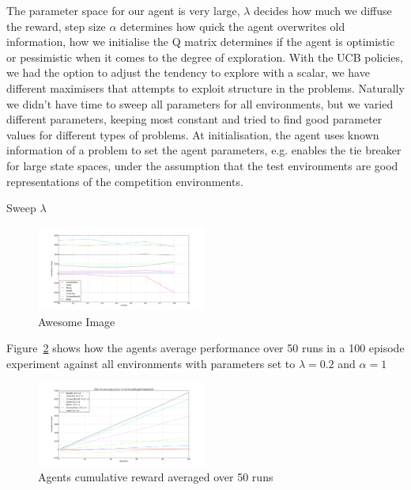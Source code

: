The parameter space for our agent is very large, $\lambda$ decides how much we diffuse the reward, step size $\alpha$ determines how quick the agent overwrites old information, how we initialise the Q matrix determines if the agent is optimistic or pessimistic when it comes to the degree of exploration. With the UCB policies, we had the option to adjust the tendency to explore with a scalar, we have different maximisers that attempts to exploit structure in the problems. Naturally we didn't have time to sweep all parameters for all environments, but we varied different parameters, keeping most constant and tried to find good parameter values for different types of problems. At initialisation, the agent uses known information of a problem to set the agent parameters, e.g. enables the tie breaker for large state spaces, under the assumption that the test environments are good representations of the competition environments.

Sweep $\lambda$
\begin{figure}[h]
    \centering
    \includegraphics[width=0.5\textwidth]{../data/lambdasweepplot.png}
    \caption{Awesome Image}
    \label{fig:awesome_image}
\end{figure}


Figure~\ref{fig:cumreward} shows how the agents average performance over 50 runs in a 100 episode experiment against all environments with parameters set to $\lambda = 0.2$ and $\alpha = 1$

\begin{figure}[h!]
    \centering
    \includegraphics[width=0.5\textwidth]{../data/100episodes_50runs.png}
    \caption{Agents cumulative reward averaged over 50 runs}
    \label{fig:cumreward}
\end{figure}

